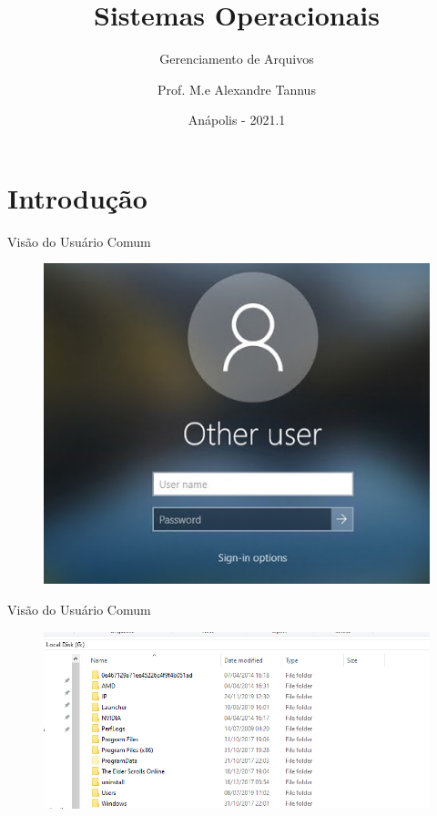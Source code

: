 \documentclass[aspectratio=169,
				xcolor=table]{beamer}
\institute[]{\uppercase{Engenharia de Software}}
\title[]{Sistemas Operacionais}
\subtitle[]{Gerenciamento de Arquivos}
\author[]{Prof. M.e Alexandre Tannus}
\date{Anápolis - 2021.1}
\begin{document}
	
	\begin{frame}
		\titlepage
	\end{frame}

	\begin{frame}
		\tableofcontents
	\end{frame}		
	
	
	\section{Introdução}
	\begin{frame}{Visão do Usuário Comum}
		\begin{figure}[hbtp]
			\centering
			\includegraphics[height=.5\paperheight]{../figs/cap09/login.jpg}
		\end{figure}
		
	\end{frame}
	
	
	\begin{frame}{Visão do Usuário Comum}
		\begin{figure}[hbtp]
			\centering
			\includegraphics[height=.7\paperheight]{../figs/cap09/structure.png}
		\end{figure}		
	\end{frame}
	
\end{document}
